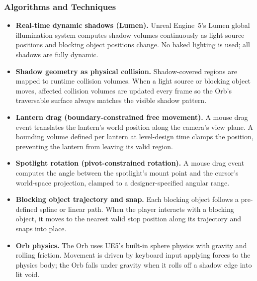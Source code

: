 \documentclass[11pt, letterpaper]{article}
\begin{document}
        \subsubsection{Algorithms and Techniques}
        \begin{itemize}[leftmargin=1.5em, itemsep=2pt]
            \item \textbf{Real-time dynamic shadows (Lumen).} Unreal Engine~5's Lumen
                  global illumination system computes shadow volumes continuously as
                  light source positions and blocking object positions change. No
                  baked lighting is used; all shadows are fully dynamic.
            \item \textbf{Shadow geometry as physical collision.} Shadow-covered
                  regions are mapped to runtime collision volumes. When a light source
                  or blocking object moves, affected collision volumes are updated
                  every frame so the Orb's traversable surface always matches the
                  visible shadow pattern.
            \item \textbf{Lantern drag (boundary-constrained free movement).} A mouse
                  drag event translates the lantern's world position along the
                  camera's view plane. A bounding volume defined per lantern at
                  level-design time clamps the position, preventing the lantern from
                  leaving its valid region.
            \item \textbf{Spotlight rotation (pivot-constrained rotation).} A mouse
                  drag event computes the angle between the spotlight's mount point
                  and the cursor's world-space projection, clamped to a
                  designer-specified angular range.
            \item \textbf{Blocking object trajectory and snap.} Each blocking object
                  follows a pre-defined spline or linear path. When the player
                  interacts with a blocking object, it moves to the nearest valid
                  stop position along its trajectory and snaps into place.
            \item \textbf{Orb physics.} The Orb uses UE5's built-in sphere physics
                  with gravity and rolling friction. Movement is driven by keyboard
                  input applying forces to the physics body; the Orb falls under
                  gravity when it rolls off a shadow edge into lit void.
        \end{itemize}
\end{document}

